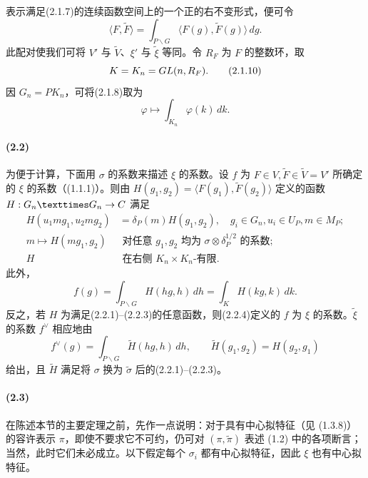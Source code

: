 表示满足(2.1.7)的连续函数空间上的一个正的右不变形式，便可令
\begin{equation}
 \langle F,\widetilde F\rangle=\int_{P\backslash G}\langle F(g),\widetilde F(g)\rangle\,dg.\tag{2.1.9}
\end{equation}
此配对使我们可将 $V'$ 与 $\widetilde V$、$\xi'$ 与 $\widetilde\xi$ 等同。令 $R_F$ 为 $F$ 的整数环，取
\begin{equation}
 K=K_n=GL(n,R_F).\tag{2.1.10}
\end{equation}
因 $G_n=PK_n$，可将(2.1.8)取为
\begin{equation}
 \varphi\longmapsto\int_{K_n}\varphi(k)\,dk.\tag{2.1.11}
\end{equation}

\paragraph*{(2.2)} 为便于计算，下面用 $\sigma$ 的系数来描述 $\xi$ 的系数。设 $f$ 为 $F\in V,\widetilde F\in\widetilde V=V'$ 所确定的 $\xi$ 的系数（(1.1.1)）。则由 $H(g_1,g_2)=\langle F(g_1),\widetilde F(g_2)\rangle$ 定义的函数 $H:G_n\times G_n\to\C$ 满足
\begin{align}
 H(u_1mg_1,u_2mg_2)&=\delta_P(m)H(g_1,g_2),\quad
 g_i\in G_n,u_i\in U_P,m\in M_P;\tag{2.2.1}\\
 m\longmapsto H(mg_1,g_2)&\text{ 对任意 }g_1,g_2\text{ 均为 }\sigma\otimes\delta_P^{1/2}\text{ 的系数};\tag{2.2.2}\\
 H&\text{ 在右侧 }K_n\times K_n\text{-有限}.\tag{2.2.3}
\end{align}
此外，
\begin{equation}
 f(g)=\int_{P\backslash G}H(hg,h)\,dh=\int_KH(kg,k)\,dk.\tag{2.2.4}
\end{equation}
反之，若 $H$ 为满足(2.2.1)--(2.2.3)的任意函数，则(2.2.4)定义的 $f$ 为 $\xi$ 的系数。$\widetilde\xi$ 的系数 $f^\vee$ 相应地由
\begin{equation}
 f^\vee(g)=\int_{P\backslash G}\widetilde H(hg,h)\,dh,\qquad
 \widetilde H(g_1,g_2)=H(g_2,g_1)\tag{2.2.5}
\end{equation}
给出，且 $\widetilde H$ 满足将 $\sigma$ 换为 $\widetilde\sigma$ 后的(2.2.1)--(2.2.3)。

\paragraph*{(2.3)} 在陈述本节的主要定理之前，先作一点说明：对于具有中心拟特征（见 (1.3.8)）的容许表示 $\pi$，即使不要求它不可约，仍可对 $(\pi,\widetilde\pi)$ 表述 (1.2) 中的各项断言；当然，此时它们未必成立。以下假定每个 $\sigma_i$ 都有中心拟特征，因此 $\xi$ 也有中心拟特征。

